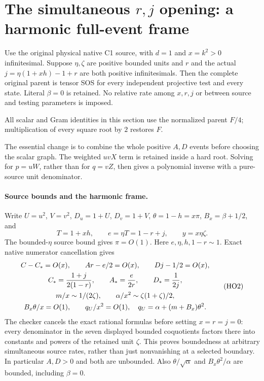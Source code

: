 \section{The simultaneous $r,j$ opening: a harmonic full-event frame}
\label{sec:r13-c1-simultaneous-rj}

\begin{theorem}
Use the original physical native C1 source, with $d=1$ and $x=k^2>0$
infinitesimal. Suppose $\eta,\zeta$ are positive bounded units and
$r$ and the actual $j=\eta(1+xh)-1+r$ are both positive
infinitesimals. Then the complete original parent is tensor SOS for
every independent projective test and every state. Literal $\beta=0$
is retained. No relative rate among $x,r,j$ or between source and
testing parameters is imposed.
\end{theorem}

All scalar and Gram identities in this section use the normalized
parent $F/4$; multiplication of every square root by $2$ restores $F$.

The essential change is to combine the whole positive $A,D$ events
before choosing the scalar graph. The weighted $uvX$ term is retained
inside a hard root. Solving for $p=uW$, rather than for $q=vZ$,
then gives a polynomial inverse with a pure-source unit denominator.

\paragraph{Source bounds and the harmonic frame.}
Write $U=u^2$, $V=v^2$, $D_u=1+U$, $D_v=1+V$,
$\theta=1-h=x\pi$, $B_x=\beta+1/2$, and
\[
 T=1+xh,\qquad e=\eta T=1-r+j,\qquad y=x\eta\zeta .
 \tag{HO1}
\]
The bounded-$\eta$ source bound gives $\pi=O(1)$.
Here $e,\eta,h,1-r\sim1$. Exact native numerator cancellation gives
\[
 \begin{gathered}
 C-C_* =O(x),\qquad Ar-e/2=O(x),\qquad Dj-1/2=O(x),\\
 C_*={1+j\over2(1-r)},\qquad A_*={e\over2r},\qquad D_*={1\over2j},\\
 m/x\sim1/(2\zeta),\qquad
 \alpha/x^2\sim\zeta(1+\zeta)/2,\\
 B_x\theta/x=O(1),\qquad
 q_U/x^2=O(1),\quad q_U=\alpha+(m+B_x)\theta^2 .
 \end{gathered}
 \tag{HO2}
\]
The checker cancels the exact rational formulas before setting
$x=r=j=0$: every denominator in the seven displayed bounded
coquotients factors there into constants and powers of the retained
unit $\zeta$. This proves boundedness at arbitrary simultaneous
source rates, rather than just nonvanishing at a selected boundary.
In particular $A,D>0$ and both are unbounded.
Also $\theta/\sqrt\alpha$ and $B_x\theta^2/\alpha$ are bounded,
including $\beta=0$.

